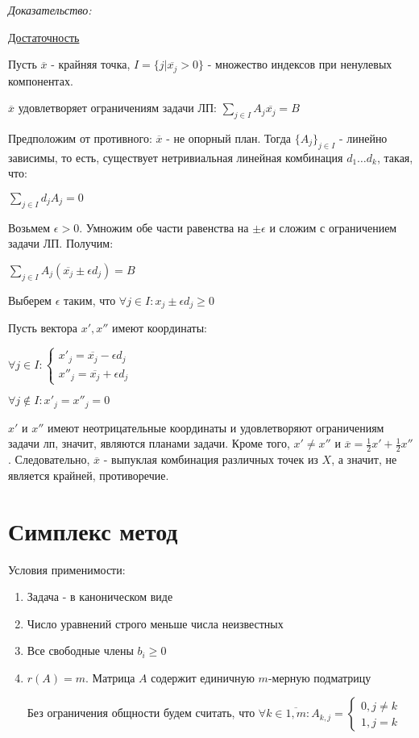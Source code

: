 \documentclass[11pt]{article}
\newenvironment{proof}{
  \textit{Доказательство:}
    
  \begin{adjustwidth}{1em}{}
}{
  \end{adjustwidth}
}
\begin{document}
\begin{sloppypar}
\begin{proof}
\underline{Достаточность}

Пусть $\overline{x}$ - крайняя точка, $I = \{j | \overline{x_j} > 0\}$ - множество индексов при ненулевых компонентах.

$\overline{x}$ удовлетворяет ограничениям задачи ЛП: $\sum_{j \in I} A_j \overline{x_j} = B$

Предположим от противного: $\overline{x}$ - не опорный план. Тогда $\{A_j\}_{j \in I}$ - линейно зависимы, то есть, существует нетривиальная линейная комбинация $d_1 \dots d_k$, такая, что:

$\sum_{j \in I} d_j A_j = 0$

Возьмем $\epsilon > 0$. Умножим обе части равенства на $\pm \epsilon$ и сложим с ограничением задачи ЛП. Получим:

$\sum_{j \in I} A_j (\overline{x_j} \pm \epsilon d_j) = B$

Выберем $\epsilon$ таким, что $\forall j \in I: x_j \pm \epsilon d_j \geq 0$

Пусть вектора $x', x''$ имеют координаты:

$\forall j \in I: \begin{cases}
  x'_j = \overline{x_j} - \epsilon d_j \\
  x''_j = \overline{x_j} + \epsilon d_j
\end{cases}$

$\forall j \notin I: x'_j = x''_j = 0$

$x'$ и $x''$ имеют неотрицательные координаты и удовлетворяют ограничениям задачи лп, значит, являются планами задачи. Кроме того, $x' \neq x''$ и $\overline{x} = \frac{1}{2}x' + \frac{1}{2}x''$. Следовательно, $\overline{x}$ - выпуклая комбинация различных точек из $X$, а значит, не является крайней, противоречие.
\end{proof}

\section*{Симплекс метод}
Условия применимости:
\begin{enumerate}
  \item Задача - в каноническом виде
  \item Число уравнений строго меньше числа неизвестных
  \item Все свободные члены $b_i \geq 0$
  \item $r(A) = m$. Матрица $A$ содержит единичную $m$-мерную подматрицу
  
  Без ограничения общности будем считать, что
  $\forall k \in \overline{1, m}: A_{k, j} = 
  \begin{cases}
    0, j \neq k \\
    1, j = k
  \end{cases}$
  

\end{enumerate}
\end{sloppypar}
\end{document}
